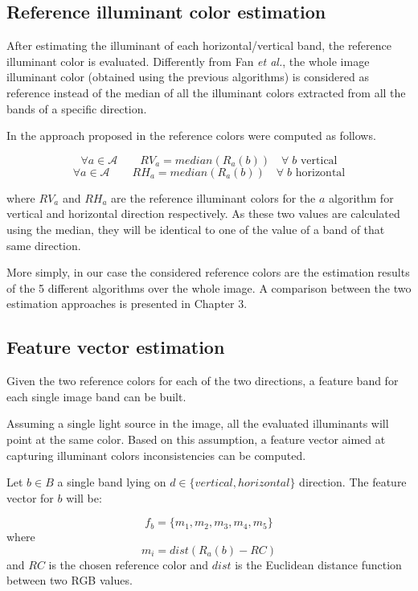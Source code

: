 \subsection{Reference illuminant color estimation}

After estimating the illuminant of each horizontal/vertical band, the reference illuminant color is evaluated. Differently from Fan \emph{et al.}\cite{fan2015image}, the whole image illuminant color (obtained using the previous algorithms) is considered as reference instead of the median of all the illuminant colors extracted from all the bands of a specific direction. 

In the approach proposed in \cite{fan2015image} the reference colors were computed as follows.
 
$$
\forall a \in \mathcal{A} \qquad RV_a = median(R_a(b)) \quad \forall \; b \textrm{ vertical}
$$
$$
\forall a \in \mathcal{A} \qquad RH_a = median(R_a(b)) \quad \forall \; b \textrm{ horizontal}
$$

where $RV_a$ and $RH_a$ are the reference illuminant colors for the $a$ algorithm for vertical and horizontal direction respectively. As these two values are calculated using the median, they will be identical to one of the value of a band of that same direction.

More simply, in our case the considered reference colors are the estimation results of the 5 different algorithms over the whole image. A comparison between the two estimation approaches is presented in Chapter 3.

\subsection{Feature vector estimation}

Given the two reference colors for each of the two directions, a feature band for each single image band can be built.

Assuming a single light source in the image, all the evaluated illuminants will point at the same color.
Based on this assumption, a feature vector aimed at capturing illuminant colors inconsistencies can be computed.

Let $b \in B$ a single band lying on $d \in \{vertical, horizontal\}$ direction. The feature vector for $b$ will be:

\begin{equation}\label{eq:regionsfeaturevector}
f_{b} = \{m_1, m_2, m_3, m_4, m_5\}
\end{equation}
where
$$
m_i = dist(R_a(b) - RC)
$$
and $RC$ is the chosen reference color and $dist$ is the Euclidean distance function between two RGB values.

